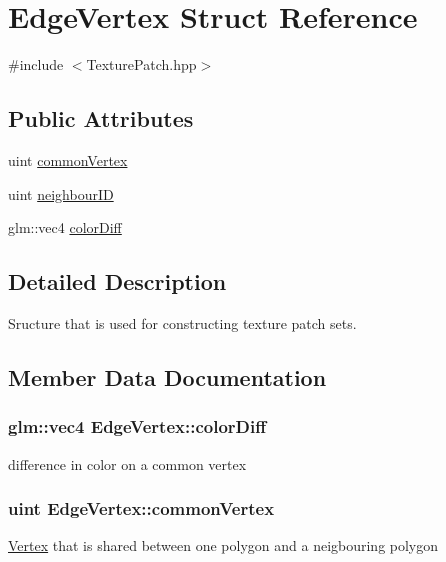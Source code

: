 \hypertarget{struct_edge_vertex}{}\section{Edge\+Vertex Struct Reference}
\label{struct_edge_vertex}


{\ttfamily \#include $<$Texture\+Patch.\+hpp$>$}

\subsection*{Public Attributes}
\begin{DoxyCompactItemize}
\item 
uint \hyperlink{struct_edge_vertex_a8439c6928189921562f355db598fcf01}{common\+Vertex}
\item 
uint \hyperlink{struct_edge_vertex_a0383800c9299c747dc5ddbf4b397806d}{neighbour\+I\+D}
\item 
glm\+::vec4 \hyperlink{struct_edge_vertex_a7c1790b8527e54c9eca13038c5351032}{color\+Diff}
\end{DoxyCompactItemize}


\subsection{Detailed Description}
Sructure that is used for constructing texture patch sets. 

\subsection{Member Data Documentation}
\hypertarget{struct_edge_vertex_a7c1790b8527e54c9eca13038c5351032}{}
\subsubsection[{color\+Diff}]{\setlength{\rightskip}{0pt plus 5cm}glm\+::vec4 Edge\+Vertex\+::color\+Diff}\label{struct_edge_vertex_a7c1790b8527e54c9eca13038c5351032}
difference in color on a common vertex \hypertarget{struct_edge_vertex_a8439c6928189921562f355db598fcf01}{}
\subsubsection[{common\+Vertex}]{\setlength{\rightskip}{0pt plus 5cm}uint Edge\+Vertex\+::common\+Vertex}\label{struct_edge_vertex_a8439c6928189921562f355db598fcf01}
\hyperlink{struct_vertex}{Vertex} that is shared between one polygon and a neigbouring polygon \hypertarget{struct_edge_vertex_a0383800c9299c747dc5ddbf4b397806d}{}
